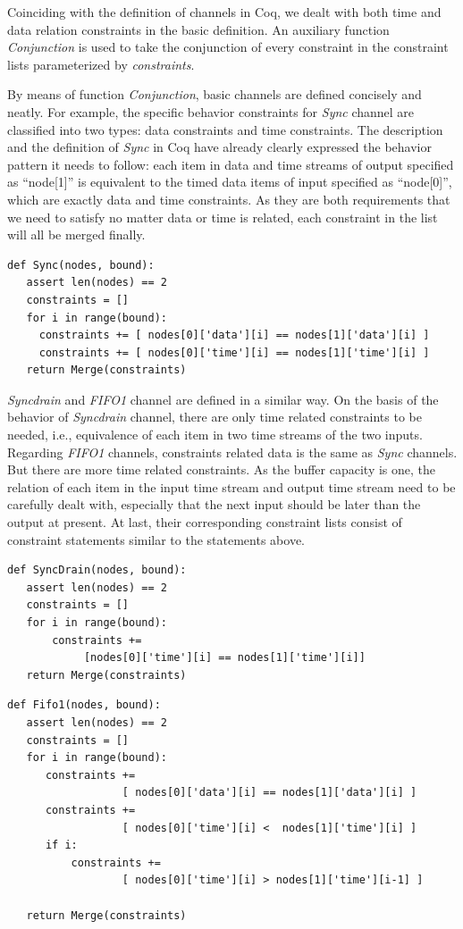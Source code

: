 \documentclass[3p,times]{elsarticle}
\begin{document}
Coinciding with the definition of channels in Coq, we dealt with both time and data relation constraints in the basic definition. An auxiliary function \emph{Conjunction} is used to take the conjunction of every constraint in the constraint lists parameterized by \emph{constraints}.

By means of function \emph{Conjunction}, basic channels are defined concisely and neatly. For example, the specific behavior constraints for \emph{Sync} channel are classified into two types: data constraints and time constraints. The description and the definition of \emph{Sync} in Coq have already clearly expressed the behavior pattern it needs to follow: each item in data and time streams of output specified as ``node[1]'' is equivalent to the timed data items of input specified as ``node[0]'', which are exactly data and time constraints. As they are both requirements that we need to satisfy no matter data or time is related, each constraint in the list will all be merged finally.
\lstset{language=Python}
\begin{lstlisting}[frame=single]
def Sync(nodes, bound):
   assert len(nodes) == 2
   constraints = []
   for i in range(bound):
     constraints += [ nodes[0]['data'][i] == nodes[1]['data'][i] ]
     constraints += [ nodes[0]['time'][i] == nodes[1]['time'][i] ]
   return Merge(constraints)
\end{lstlisting}

\emph{Syncdrain} and \emph{FIFO1} channel are defined in a similar way. On the basis of the behavior of \emph{Syncdrain} channel, there are only time related constraints to be needed, i.e., equivalence of each item in two time streams of the two inputs. Regarding \emph{FIFO1} channels, constraints related data is the same as \emph{Sync} channels. But there are more time related constraints. As the buffer capacity is one, the relation of each item in the input time stream and output time stream need to be carefully dealt with, especially that the next input should be later than the output at present. At last, their corresponding constraint lists consist of constraint statements similar to the statements above.
\begin{lstlisting}[frame=single]
def SyncDrain(nodes, bound):
   assert len(nodes) == 2
   constraints = []
   for i in range(bound):
       constraints +=
            [nodes[0]['time'][i] == nodes[1]['time'][i]]
   return Merge(constraints)
\end{lstlisting}
\begin{lstlisting}[frame=single]
def Fifo1(nodes, bound):
   assert len(nodes) == 2
   constraints = []
   for i in range(bound):
      constraints +=
                  [ nodes[0]['data'][i] == nodes[1]['data'][i] ]
      constraints +=
                  [ nodes[0]['time'][i] <  nodes[1]['time'][i] ]
      if i:
          constraints +=
                  [ nodes[0]['time'][i] > nodes[1]['time'][i-1] ]

   return Merge(constraints)
\end{lstlisting}
\end{document}
